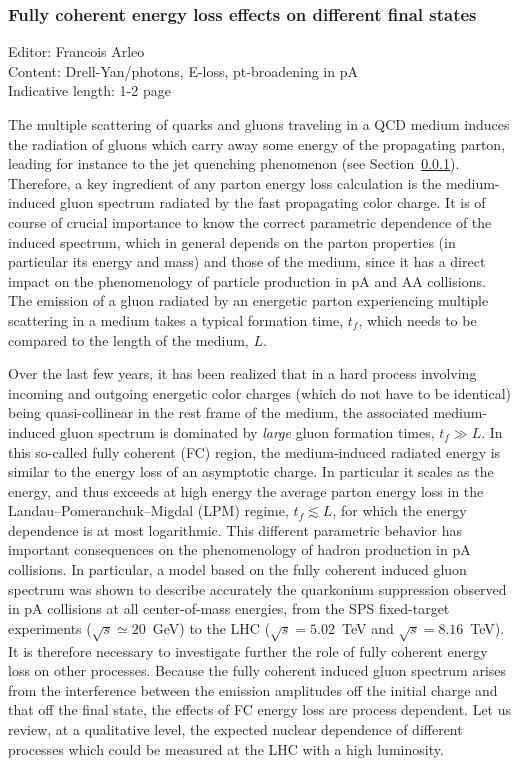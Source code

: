 \documentclass[../report.tex]{subfiles}
\begin{document}
\subsubsection{Fully coherent energy loss effects on different final states}
Editor: Francois Arleo\\
Content: Drell-Yan/photons, E-loss, pt-broadening in pA\\
Indicative length: 1-2 page

The multiple scattering of quarks and gluons traveling in a QCD medium induces the radiation of gluons which carry away some energy of the propagating parton, leading for instance to the jet quenching phenomenon (see Section~\ref{}). Therefore, a key ingredient of any parton energy loss calculation is  the medium-induced gluon spectrum radiated by the fast propagating color charge. It is of course of crucial importance to know the correct parametric dependence of the induced spectrum, which in general depends on the parton properties (in particular its energy and mass) and those of the medium, since it has a direct impact on the phenomenology of particle production in pA and AA collisions. The emission of a gluon radiated by an energetic parton experiencing multiple scattering in a medium takes a typical formation time, $t_f$, which needs to be compared to the length of the medium, $L$.

Over the last few years, it has been realized that in a hard process involving incoming and outgoing energetic color charges (which do not have to be identical) being quasi-collinear in the rest frame of the medium, the associated medium-induced gluon spectrum is dominated by {\it large} gluon formation times, $t_f \gg L$. In this so-called fully coherent (FC) region, the medium-induced radiated energy is similar to the energy loss of an asymptotic charge. In particular it scales as the energy, and thus exceeds at high energy the average parton energy loss in the Landau--Pomeranchuk--Migdal (LPM) regime, $t_f \lesssim L$, for which the energy dependence is at most logarithmic.
%
This different parametric behavior has important consequences on the phenomenology of hadron production in pA collisions. In particular, a model based on the fully coherent induced gluon spectrum was shown to describe accurately the quarkonium suppression observed in pA collisions at all center-of-mass energies, from the SPS fixed-target experiments ($\sqrt{s}\simeq 20$~GeV) to the LHC ($\sqrt{s}=5.02$~TeV and $\sqrt{s}=8.16$~TeV). It is therefore necessary to investigate further the role of fully coherent energy loss on other processes.
%
Because the fully coherent induced gluon spectrum arises from the interference between the emission amplitudes off the initial charge and that off the final state, the effects of FC energy loss are process dependent. Let us review, at a qualitative level, the expected nuclear dependence of different processes which could be measured at the LHC with a high luminosity.
\end{document}
